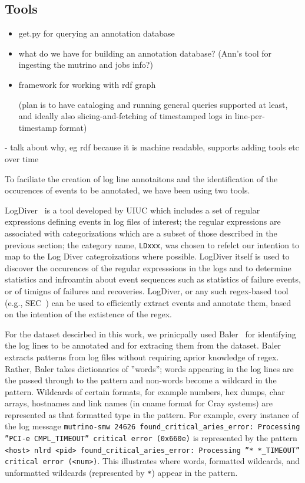 \subsection{Tools}
\begin{itemize}
\item get.py for querying an annotation database
\item what do we have for building an annotation database? (Ann's tool for ingesting the mutrino and jobs info?)
\item framework for working with rdf graph

(plan is to have cataloging and running general queries supported at least, and ideally also slicing-and-fetching of timestamped logs in line-per-timestamp format)
\end{itemize}


- talk about why, eg rdf because it is machine readable, supports adding tools etc over time 


To faciliate the creation of log line annotaitons
and the identification of the occurences of events to be annotated,
we have been using two tools.

LogDiver~\cite{LogDiver} is a tool developed by UIUC which includes a set of regular expressions defining
events in log files of interest; the regular expressions are associated with categorizations
which are a subset of those described in the previous section; the
category name, \texttt{LDxxx}, was chosen to refelct our intention to map to the
Log Diver categroizations where possible.
LogDiver itself is used to discover the occurences of the regular
expresssions in the logs and to determine statistics and infroamtin about event sequences
such as statistics of failure events, or of timigns of failures and recoveries.
LogDiver, or any such regex-based tool (e.g., SEC~\cite{SEC}) can be used to efficiently extract events
and annotate them, based on the intention of the extistence of the regex.

For the dataset descirbed in this work, we prinicpally used Baler~\cite{Baler} for
identifying the log lines to be annotated and for extracing them from the dataset.
Baler extracts patterns from log files without requiring aprior knowledge of
regex. Rather, Baler takes dictionaries of ''words''; words appearing in the log lines
are the passed through to the pattern and non-words become a wildcard in the pattern.
Wildcards of certain formats, for example numbers, hex dumps, char arrays, hostnames and link names
(in cname format for Cray systems) are represented as that formatted type in the pattern.
For example, every instance of the log message \texttt{mutrino-smw 24626 found\_critical\_aries\_error: Processing ''PCI-e CMPL\_TIMEOUT'' critical error (0x660e)}
is represented by the pattern \texttt{<host> nlrd <pid> found\_critical\_aries\_error: Processing ''* *\_TIMEOUT'' critical error (<num>)}.
This illustrates where words, formatted wildcards, and unformatted wildcards (represented by \texttt{*}) appear in the pattern.

